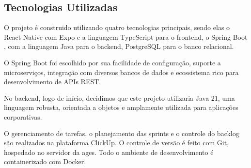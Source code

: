 \subsection{Tecnologias Utilizadas}
  O projeto é construido utilizando quatro tecnologias principais, sendo elas o React Native \cite{reactnative} com Expo e a linguagem TypeScript \cite{typescript} para o frontend, o Spring Boot \cite{springboot}, com a linguagem Java para o backend, PostgreSQL para o banco relacional.
  
  O Spring Boot foi escolhido por sua facilidade de configuração, suporte a microserviços, integração com diversos bancos de dados e ecossistema rico para desenvolvimento de APIs REST.

  No backend, logo de início, decidimos que este projeto utilizaria Java 21, uma linguagem robusta, orientada a objetos e amplamente utilizada para aplicações corporativas.

  O gerenciamento de tarefas, o planejamento das sprints e o controle do backlog são realizados na plataforma ClickUp. O controle de versão é feito com Git, hospedado no servidor da \acs{ages}. Todo o ambiente de desenvolvimento é containerizado com Docker.